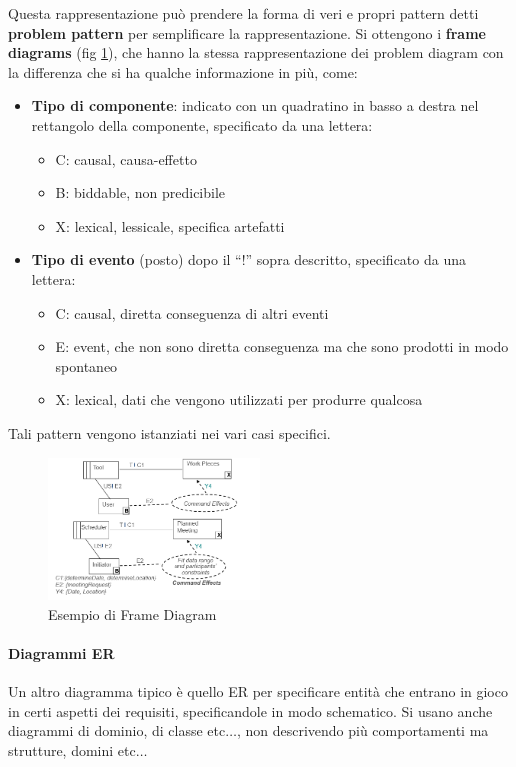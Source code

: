 Questa rappresentazione può prendere la forma di veri e propri pattern detti
\textbf{problem pattern} per semplificare la rappresentazione. Si ottengono i
\textbf{frame diagrams} (fig \ref{fig:frame-diagram}), che hanno la stessa
rappresentazione dei problem diagram con la differenza che si ha qualche informazione
in più, come:
\begin{itemize}
      \item \textbf{Tipo di componente}: indicato con un quadratino in basso a
            destra nel rettangolo della componente, specificato da una lettera:
            \begin{itemize}
                  \item C: causal, causa-effetto
                  \item B: biddable, non predicibile
                  \item X: lexical, lessicale, specifica artefatti
            \end{itemize}
      \item \textbf{Tipo di evento} (posto) dopo il “!” sopra descritto,
            specificato da una lettera:
            \begin{itemize}
                  \item C: causal, diretta conseguenza di altri eventi
                  \item E: event, che non sono diretta conseguenza ma che sono
                        prodotti in modo spontaneo
                  \item X: lexical, dati che vengono utilizzati per produrre
                        qualcosa
            \end{itemize}
\end{itemize}
Tali pattern vengono istanziati nei vari casi specifici.
\begin{figure}[!ht]
      \centering
      \includegraphics[width = 0.5\textwidth]{img/requirements/frame-diagram.png}
      \caption{Esempio di Frame Diagram}
      \label{fig:frame-diagram}
\end{figure}
\paragraph{Diagrammi ER}
Un altro diagramma tipico è quello ER per specificare entità che entrano in gioco
in certi aspetti dei requisiti, specificandole in modo schematico. Si usano anche
diagrammi di dominio, di classe etc$\dots$, non descrivendo più comportamenti
ma strutture, domini etc$\dots$
